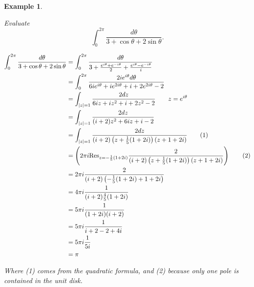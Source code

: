 \documentclass[12pt]{Qual}
\newtheorem{example}{Example}
\begin{document}
\begin{example}
$\,$
\begin{framed}
Evaluate $$\int_0^{2\pi}\frac{d\theta}{3+\cos\theta+2\sin\theta}.$$
\end{framed}
\begin{align*}
    \int_0^{2\pi}\frac{d\theta}{3+\cos\theta+2\sin\theta}&=\int_0^{2\pi}\frac{d\theta}{3+\frac{e^{i\theta}+e^{-i\theta}}{2}+\frac{e^{i\theta}-e^{-i\theta}}{i}}\\
    &=\int_0^{2\pi}\frac{2ie^{i\theta}d\theta}{6ie^{i\theta}+ie^{2i\theta}+i+2e^{2i\theta}-2}\\
    &=\int_{|z|=1}\frac{2dz}{6iz+iz^2+i+2z^2-2}\qquad z=e^{i\theta}\\
    &=\int_{|z|=1}\frac{2dz}{(i+2)z^2+6iz+i-2}\\
    &=\int_{|z|=1}\frac{2dz}{(i+2)\left(z+\frac{1}{5}(1+2i)\right)(z+1+2i)}\tag{1}\\
    &=\left(2\pi i\text{Res}_{z=-\frac{1}{5}(1+2i)}\frac{2}{(i+2)\left(z+\frac{1}{5}(1+2i)\right)(z+1+2i)}\right)\tag{2}\\
    &=2\pi i \frac{2}{(i+2)\left(-\frac{1}{5}(1+2i)+1+2i\right)}\\
    &=4\pi i\frac{1}{(i+2)\frac{4}{5}(1+2i)}\\
    &=5\pi i\frac{1}{(1+2i)(i+2)}\\
    &=5\pi i\frac{1}{i+2-2+4i}\\
    &=5\pi i\frac{1}{5i}\\
    &=\pi
\end{align*}

Where (1) comes from the quadratic formula, and (2) because only one pole is contained in the unit disk.
\end{example}
\vspace{0.5cm}
\end{document}

